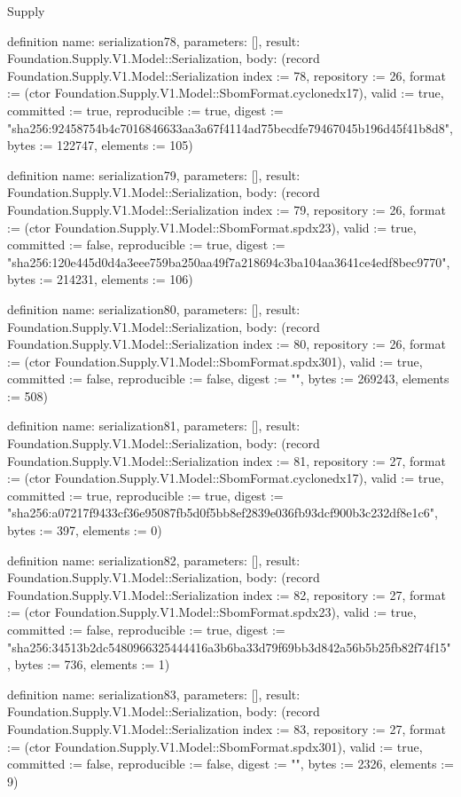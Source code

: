\begin{lexlean}{Supply}
\begin{semanticmodule}
definition{
  name: serialization78,
  parameters: [],
  result: Foundation.Supply.V1.Model::Serialization,
  body: (record Foundation.Supply.V1.Model::Serialization {index := 78, repository := 26, format := (ctor Foundation.Supply.V1.Model::SbomFormat.cyclonedx17), valid := true, committed := true, reproducible := true, digest := "sha256:92458754b4c7016846633aa3a67f4114ad75becdfe79467045b196d45f41b8d8", bytes := 122747, elements := 105})
}

definition{
  name: serialization79,
  parameters: [],
  result: Foundation.Supply.V1.Model::Serialization,
  body: (record Foundation.Supply.V1.Model::Serialization {index := 79, repository := 26, format := (ctor Foundation.Supply.V1.Model::SbomFormat.spdx23), valid := true, committed := false, reproducible := true, digest := "sha256:120e445d0d4a3eee759ba250aa49f7a218694c3ba104aa3641ce4edf8bec9770", bytes := 214231, elements := 106})
}

definition{
  name: serialization80,
  parameters: [],
  result: Foundation.Supply.V1.Model::Serialization,
  body: (record Foundation.Supply.V1.Model::Serialization {index := 80, repository := 26, format := (ctor Foundation.Supply.V1.Model::SbomFormat.spdx301), valid := true, committed := false, reproducible := false, digest := "", bytes := 269243, elements := 508})
}

definition{
  name: serialization81,
  parameters: [],
  result: Foundation.Supply.V1.Model::Serialization,
  body: (record Foundation.Supply.V1.Model::Serialization {index := 81, repository := 27, format := (ctor Foundation.Supply.V1.Model::SbomFormat.cyclonedx17), valid := true, committed := true, reproducible := true, digest := "sha256:a07217f9433cf36e95087fb5d0f5bb8ef2839e036fb93dcf900b3c232df8e1c6", bytes := 397, elements := 0})
}

definition{
  name: serialization82,
  parameters: [],
  result: Foundation.Supply.V1.Model::Serialization,
  body: (record Foundation.Supply.V1.Model::Serialization {index := 82, repository := 27, format := (ctor Foundation.Supply.V1.Model::SbomFormat.spdx23), valid := true, committed := false, reproducible := true, digest := "sha256:34513b2dc5480966325444416a3b6ba33d79f69bb3d842a56b5b25fb82f74f15", bytes := 736, elements := 1})
}

definition{
  name: serialization83,
  parameters: [],
  result: Foundation.Supply.V1.Model::Serialization,
  body: (record Foundation.Supply.V1.Model::Serialization {index := 83, repository := 27, format := (ctor Foundation.Supply.V1.Model::SbomFormat.spdx301), valid := true, committed := false, reproducible := false, digest := "", bytes := 2326, elements := 9})
}


\end{semanticmodule}
\end{lexlean}
